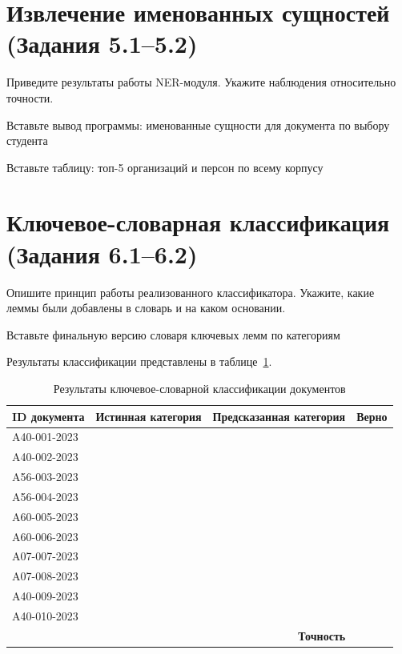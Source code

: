 \documentclass[12pt, a4paper]{report}
\newcommand{\placeholder}[2][Вставьте результат]{%
  \begin{tcolorbox}[placeholderbox, title={#2}]
    #1
  \end{tcolorbox}%
  \vspace{4pt}%
}
\begin{document}
\section{Извлечение именованных сущностей (Задания 5.1–5.2)}

Приведите результаты работы NER-модуля. Укажите наблюдения относительно точности.

\placeholder[Вставьте вывод программы: именованные сущности для документа по выбору студента]{Именованные сущности в выбранном документе}

\placeholder[Вставьте таблицу: топ-5 организаций и персон по всему корпусу]{Сводная таблица именованных сущностей}

\section{Ключевое-словарная классификация (Задания 6.1–6.2)}

Опишите принцип работы реализованного классификатора. Укажите, какие леммы были
добавлены в словарь и на каком основании.

\placeholder[Вставьте финальную версию словаря ключевых лемм по категориям]{Расширенный словарь ключевых лемм}

Результаты классификации представлены в таблице~\ref{tab:classification}.

\begin{table}[h]
  \centering
  \caption{Результаты ключевое-словарной классификации документов}
  \label{tab:classification}
  \begin{tabularx}{\textwidth}{l X X c}
    \toprule
    \rowcolor{LightBlue}
    \textsf{\textbf{ID документа}} &
    \textsf{\textbf{Истинная категория}} &
    \textsf{\textbf{Предсказанная категория}} &
    \textsf{\textbf{Верно}} \\
    \midrule
    A40-001-2023 & & & \\
    A40-002-2023 & & & \\
    A56-003-2023 & & & \\
    A56-004-2023 & & & \\
    A60-005-2023 & & & \\
    A60-006-2023 & & & \\
    A07-007-2023 & & & \\
    A07-008-2023 & & & \\
    A40-009-2023 & & & \\
    A40-010-2023 & & & \\
    \midrule
    \multicolumn{3}{r}{\textsf{\textbf{Точность}}} & \textbf{\underline{\hspace{1.5cm}}} \\
    \bottomrule
  \end{tabularx}
\end{table}
\end{document}
